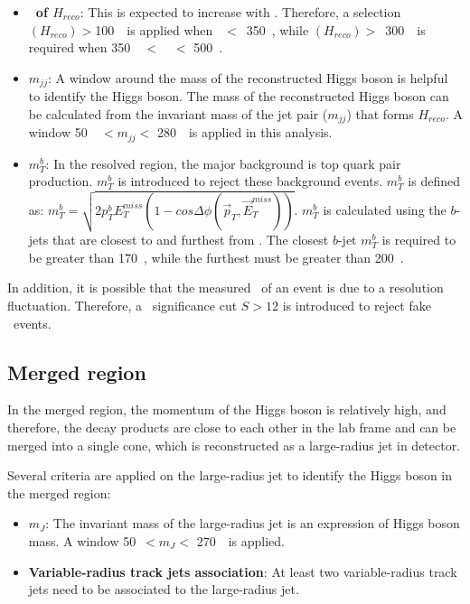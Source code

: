 \begin{itemize}
    \item \textbf{\pt~of $H_{reco}$}: This is expected to increase with \met. Therefore, a selection \pt$(H_{reco})>$100~\GeV~is applied when \met~$<$~350~\GeV, while \pt$(H_{reco}) >$~300~\GeV~is required when 
        350~\GeV~$<$~\met~$<$ 500~\GeV.
    \item \textbf{$m_{jj}$}: A window around the mass of the reconstructed Higgs boson is helpful to identify the Higgs boson. The mass of the reconstructed Higgs boson can be calculated from the invariant mass of the jet pair ($m_{jj}$) that forms $H_{reco}$. A window 50~\GeV~$< m_{jj} <$ 280~\GeV~is applied in this analysis. 
    \item \textbf{$m_{T}^{b}$}: In the resolved region, the major background is top quark pair production. $m_{T}^{b}$ is introduced to reject these background events. $m_{T}^{b}$ is defined as: $m_{T}^{b}=\sqrt{2p_{T}^{b}E_{T}^{miss}(1-cos\Delta\phi(\vec{p}_{T}, \vec{E}_{T}^{miss}))}$. $m_{T}^{b}$ is calculated using the $b$-jets that are closest to and furthest from \met. The closest $b$-jet $m_{T}^b$ is required to be greater than 170~\GeV, while the furthest must be greater than 200~\GeV.
\end{itemize}

\par In addition, it is possible that the measured \met~of an event is due to a resolution fluctuation. Therefore, a \met~significance cut $S > 12$ is introduced to reject fake \met~events.

\subsection{Merged region}

\par In the merged region, the momentum of the Higgs boson is relatively high, and therefore, the decay products are close to each other in the lab frame and can be merged into a single cone, which is reconstructed as a large-radius jet in detector.
\par Several criteria are applied on the large-radius jet to identify the Higgs boson in the merged region:
\begin{itemize}
    \item \textbf{$m_{J}$}: The invariant mass of the large-radius jet is an expression of Higgs boson mass. A window 50~\GeV $< m_{J} <$ 270~\GeV~is applied.
    \item \textbf{Variable-radius track jets association}: At least two variable-radius track jets need to be associated to the large-radius jet.
\end{itemize}

